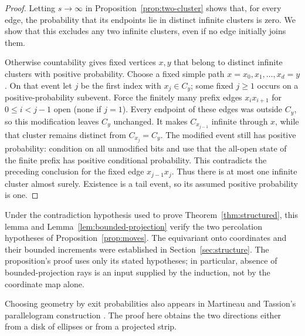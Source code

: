 \begin{proof}
Letting $s\to\infty$ in Proposition~\ref{prop:two-cluster} shows that,
for every edge, the probability that its endpoints lie in distinct
infinite clusters is zero. We show that this excludes any two infinite
clusters, even if no edge initially joins them.

Otherwise countability gives fixed vertices $x,y$ that belong to
distinct infinite clusters with positive probability. Choose a fixed
simple path $x=x_0,x_1,\ldots,x_d=y$. On that event let $j$ be the
first index with $x_j\in C_y$; some fixed $j\ge1$ occurs on a
positive-probability subevent. Force the finitely many prefix edges
$x_ix_{i+1}$ for $0\le i<j-1$ open (none if $j=1$). Every endpoint of these edges
was outside $C_y$, so this modification leaves $C_y$ unchanged.
It makes $C_{x_{j-1}}$ infinite through $x$, while that cluster
remains distinct from $C_{x_j}=C_y$. The modified event still has
positive probability: condition on all unmodified bits and use that
the all-open state of the finite prefix has positive conditional
probability. This contradicts the preceding conclusion for the
fixed edge $x_{j-1}x_j$. Thus there is at most one infinite cluster
almost surely. Existence is a tail event, so its assumed positive
probability is one.
\end{proof}

Under the contradiction hypothesis used to prove
Theorem~\ref{thm:structured}, this lemma
and Lemma~\ref{lem:bounded-projection} verify the two percolation
hypotheses of Proposition~\ref{prop:moves}. The equivariant onto
coordinates and their bounded increments were established in
Section~\ref{sec:structure}. The proposition's proof uses only its
stated hypotheses; in particular, absence of bounded-projection rays
is an input supplied by the induction, not by the coordinate map alone.

Choosing geometry by exit probabilities also appears in Martineau and
Tassion's parallelogram construction
\cite[Section~3.2]{MartineauTassion2017}. The proof here obtains the two
directions either from a disk of ellipses or from a projected strip.

